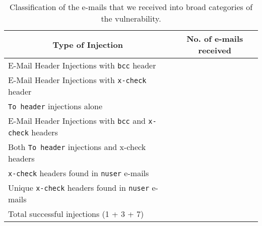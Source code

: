 \begin{table*}[tbp]
	\centering
	\begin{tabular}{|l|c|}
		\hline
		\multicolumn{1}{|c|}{\textbf{Type of Injection}} &
		\multicolumn{1}{p{3cm}|}{\centering \textbf{No. of e-mails received}}\\
		\hline
		E-Mail Header Injections with \texttt{bcc} header & \ehibcc \\
		\hline
		E-Mail Header Injections with \texttt{x-check} header & \ehixcheck \\
		\hline
		\texttt{To header} injections alone & \ehito \\
		\hline
		E-Mail Header Injections with \texttt{bcc} and \texttt{x-check} headers & \ehibccxcheck \\
		\hline
		Both \texttt{To header} injections and x-check headers &
		\ehitoxcheck \\
		\hline
		\texttt{x-check} headers found in \texttt{nuser} e-mails & \ehinuserxcheck \\
		\hline
		Unique \texttt{x-check} headers found in \texttt{nuser} e-mails & \ehiuniquenuserxcheck \\
		\hline
		Total successful injections (1 + 3 + 7) & \success \\
		
		\hline
	\end{tabular}
	\caption[]{Classification of the e-mails that we received into broad categories of the vulnerability.}
	\label{tab:analysis}
\end{table*}

